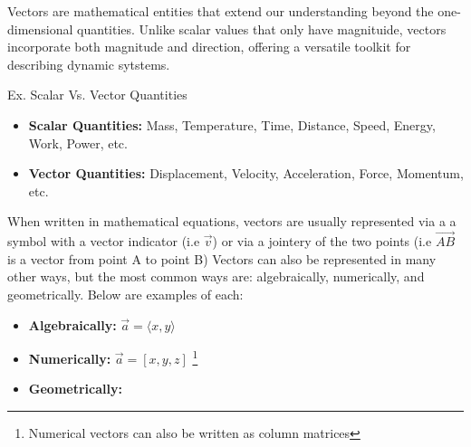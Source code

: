 \documentclass[14pt]{article}
\begin{document}
        \begin{flushleft}

            Vectors are mathematical entities that extend our understanding beyond the 
            one-dimensional quantities. Unlike scalar values that only have magnituide, 
            vectors incorporate both magnitude and direction, offering a versatile toolkit
            for describing dynamic sytstems. 

            \begin{mdframed}

                Ex. Scalar Vs. Vector Quantities

                \begin{itemize}
                    \item \textbf{Scalar Quantities:} Mass, Temperature, Time, Distance, Speed, 
                    Energy, Work, Power, etc.
                    \item \textbf{Vector Quantities:} Displacement, Velocity, Acceleration, 
                    Force, Momentum, etc.
                \end{itemize}
            \end{mdframed}

            When written in mathematical equations, vectors are usually represented via a a symbol with a vector indicator (i.e $\vec{v}$)
            or via a jointery of the two points (i.e $\vec{AB}$ is a vector from point A to point B) Vectors 
            can also be represented in many other ways, but the most common ways are: algebraically, numerically, 
            and geometrically. Below are examples of each:

            \begin{itemize}

                \item \textbf{Algebraically:} $\vec{a} = \langle x, y \rangle$
                \item  \textbf{Numerically:} $\vec{a} = \left[ x, y, z \right]$ \footnote{Numerical vectors can also be written as column matrices}
                \item { \textbf{Geometrically:} 

}
\end{itemize}
\end{flushleft}
\end{document}

